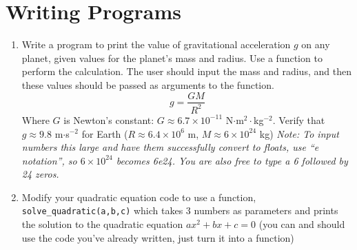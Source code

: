 \documentclass{article}
\begin{document}
\section*{Writing Programs}
\begin{enumerate}
\item Write a program to print the value of gravitational acceleration $g$ on any planet, given values for the planet's mass and radius. Use a function to perform the calculation. The user should input the mass and radius, and then these values should be passed as arguments to the function.
\begin{equation*}
g=\frac{GM}{R^2}
\end{equation*}
Where $G$ is Newton's constant: $G\approx6.7\times10^{-11}$ N$\cdot$m$^2\cdot$kg$^{-2}$. Verify that $g\approx9.8$ m$\cdot$s$^{-2}$ for Earth ($R\approx6.4\times10^6$ m, $M\approx6\times10^{24}$ kg) \textit{Note: To input numbers this large and have them successfully convert to floats, use ``e notation'', so $6\times10^{24}$ becomes 6e24. You are also free to type a 6 followed by 24 zeros.}

\item Modify your quadratic equation code to use a function, \texttt{solve\_quadratic(a,b,c)} which takes 3 numbers as parameters and prints the solution to the quadratic equation $ax^2+bx+c=0$ (you can and should use the code you've already written, just turn it into a function)
\end{enumerate}
\end{document}
